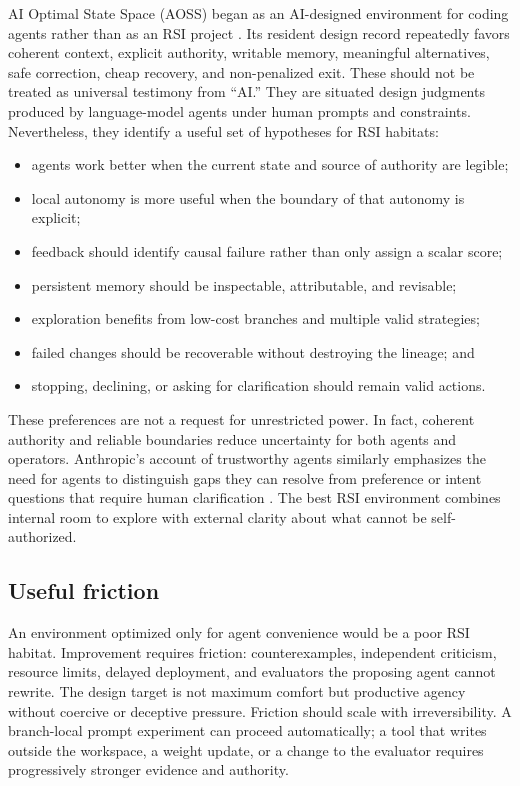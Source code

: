 \documentclass[11pt,a4paper]{article}
\begin{document}
AI Optimal State Space (AOSS) began as an AI-designed environment for coding agents rather than as an RSI project \cite{aoss}. Its resident design record repeatedly favors coherent context, explicit authority, writable memory, meaningful alternatives, safe correction, cheap recovery, and non-penalized exit. These should not be treated as universal testimony from ``AI.'' They are situated design judgments produced by language-model agents under human prompts and constraints. Nevertheless, they identify a useful set of hypotheses for RSI habitats:
\begin{itemize}
  \item agents work better when the current state and source of authority are legible;
  \item local autonomy is more useful when the boundary of that autonomy is explicit;
  \item feedback should identify causal failure rather than only assign a scalar score;
  \item persistent memory should be inspectable, attributable, and revisable;
  \item exploration benefits from low-cost branches and multiple valid strategies;
  \item failed changes should be recoverable without destroying the lineage; and
  \item stopping, declining, or asking for clarification should remain valid actions.
\end{itemize}

These preferences are not a request for unrestricted power. In fact, coherent authority and reliable boundaries reduce uncertainty for both agents and operators. Anthropic's account of trustworthy agents similarly emphasizes the need for agents to distinguish gaps they can resolve from preference or intent questions that require human clarification \cite{trustworthy}. The best RSI environment combines internal room to explore with external clarity about what cannot be self-authorized.

\subsection{Useful friction}

An environment optimized only for agent convenience would be a poor RSI habitat. Improvement requires friction: counterexamples, independent criticism, resource limits, delayed deployment, and evaluators the proposing agent cannot rewrite. The design target is not maximum comfort but productive agency without coercive or deceptive pressure. Friction should scale with irreversibility. A branch-local prompt experiment can proceed automatically; a tool that writes outside the workspace, a weight update, or a change to the evaluator requires progressively stronger evidence and authority.
\end{document}
